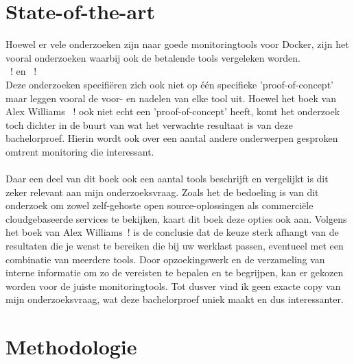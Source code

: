 
\section{State-of-the-art}
\label{sec:state-of-the-art}

Hoewel er vele onderzoeken zijn naar goede monitoringtools voor Docker, zijn het vooral onderzoeken waarbij ook de betalende tools vergeleken worden. \\~\autocite{Ribenzaft2020}! en ~\autocite{Cirelly2020}!\\ Deze onderzoeken specifiëren zich ook niet op één specifieke 'proof-of-concept' maar leggen vooral de voor- en nadelen van elke tool uit.
Hoewel het boek van Alex Williams ~\autocite{2015}! ook niet echt een 'proof-of-concept' heeft, komt het onderzoek toch dichter in de buurt van wat het verwachte resultaat is van deze bachelorproef. Hierin wordt ook over een aantal andere onderwerpen gesproken omtrent monitoring die interessant. 
\\
\\
Daar een deel van dit boek ook een aantal tools beschrijft en vergelijkt is dit zeker relevant aan mijn onderzoeksvraag. Zoals het de bedoeling is van dit onderzoek om zowel zelf-gehoste open source-oplossingen als commerciële cloudgebaseerde services te bekijken, kaart dit boek deze opties ook aan. Volgens het boek van Alex Williams~\autocite{2015}! is de conclusie dat de keuze sterk afhangt van de resultaten die je wenst te bereiken die bij uw werklast passen, eventueel met een combinatie van meerdere tools. Door opzoekingswerk en de verzameling van interne informatie om zo de vereisten te bepalen en te begrijpen, kan er gekozen worden voor de juiste monitoringtools. Tot dusver vind ik geen exacte copy van mijn onderzoeksvraag, wat deze bachelorproef uniek maakt en dus interessanter.



\section{Methodologie}
\label{sec:methodologie}


